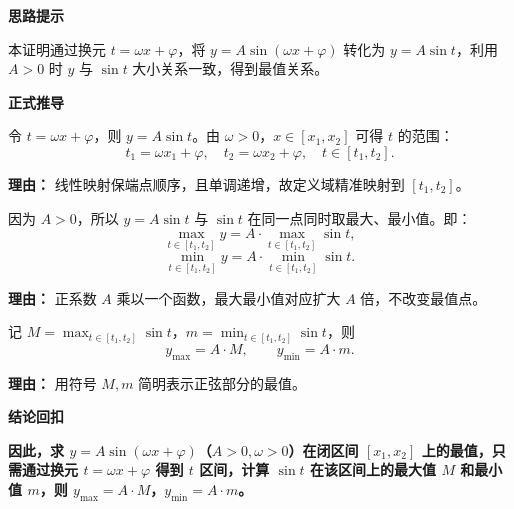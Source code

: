 \begin{proofbox}
	\textbf{\textcolor{CProof}{思路提示}}

	本证明通过换元 $t=\omega x+\varphi$，将 $y=A\sin(\omega x+\varphi)$ 转化为 $y=A\sin t$，利用 $A>0$ 时 $y$ 与 $\sin t$ 大小关系一致，得到最值关系。

	\medskip
	\textbf{\textcolor{CProof}{正式推导}}
	\begin{description}[style=nextline, leftmargin=2.8em, labelsep=0.5em, itemsep=0.55em]
		\item[\textbf{步骤一（换元映射）：}] 令 $t=\omega x+\varphi$，则 $y=A\sin t$。由 $\omega>0$，$x\in[x_1,x_2]$ 可得 $t$ 的范围：
			\[
				t_1 = \omega x_1 + \varphi,\quad t_2 = \omega x_2 + \varphi,\quad t\in[t_1,t_2].
			\]
			\par\textbf{理由：} 线性映射保端点顺序，且单调递增，故定义域精准映射到 $[t_1,t_2]$。

		\item[\textbf{步骤二（正相关关系）：}] 因为 $A>0$，所以 $y=A\sin t$ 与 $\sin t$ 在同一点同时取最大、最小值。即：
			\[
				\max_{t\in[t_1,t_2]} y = A\cdot\max_{t\in[t_1,t_2]}\sin t,
			\]
			\[
				\min_{t\in[t_1,t_2]} y = A\cdot\min_{t\in[t_1,t_2]}\sin t.
			\]
			\par\textbf{理由：} 正系数 $A$ 乘以一个函数，最大最小值对应扩大 $A$ 倍，不改变最值点。

		\item[\textbf{步骤三（最值公式）：}] 记 $M=\max_{t\in[t_1,t_2]}\sin t$，$m=\min_{t\in[t_1,t_2]}\sin t$，则
			\[
				y_{\max}=A\cdot M,
				\qquad
				y_{\min}=A\cdot m.
			\]
			\par\textbf{理由：} 用符号 $M,m$ 简明表示正弦部分的最值。
	\end{description}

	\medskip
	\textbf{\textcolor{CProof}{结论回扣}}

	\textbf{因此，求 $y=A\sin(\omega x+\varphi)$（$A>0,\omega>0$）在闭区间 $[x_1,x_2]$ 上的最值，只需通过换元 $t=\omega x+\varphi$ 得到 $t$ 区间，计算 $\sin t$ 在该区间上的最大值 $M$ 和最小值 $m$，则 $y_{\max}=A\cdot M$，$y_{\min}=A\cdot m$。}
\end{proofbox}
